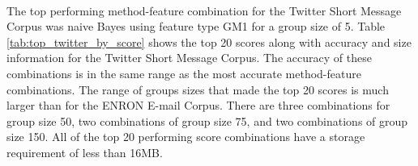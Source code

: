 \paragraph*{}  The top performing method-feature combination for the Twitter Short Message Corpus was naive Bayes using feature type GM1 for a group size of 5.  Table \ref{tab:top_twitter_by_score} shows the top 20 scores along with accuracy and size information for the Twitter Short Message Corpus.  The accuracy of these combinations is in the same range as the most accurate method-feature combinations. The range of groups sizes that made the top 20 scores is much larger than for the ENRON E-mail Corpus.  There are three combinations for group size 50, two combinations of group size 75, and two combinations of group size 150. All of the top 20 performing score combinations have a storage requirement of less than 16MB.

